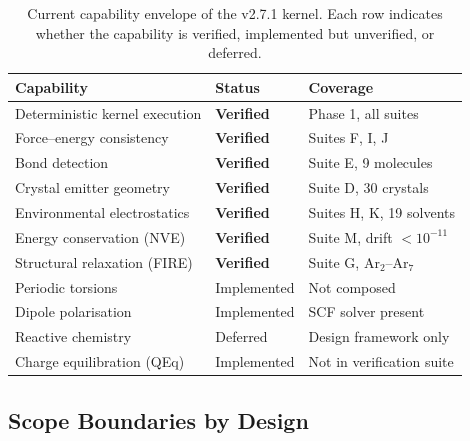 \documentclass[11pt,twoside]{article}
\begin{document}
\begin{table}[H]
\centering
\caption{Current capability envelope of the v2.7.1 kernel. Each row indicates whether the capability is verified, implemented but unverified, or deferred.}
\label{tab:capability-envelope}
\begin{tabular}{lll}
\toprule
\textbf{Capability} & \textbf{Status} & \textbf{Coverage} \\
\midrule
Deterministic kernel execution    & \textbf{Verified} & Phase 1, all suites \\
Force--energy consistency          & \textbf{Verified} & Suites F, I, J \\
Bond detection                     & \textbf{Verified} & Suite E, 9 molecules \\
Crystal emitter geometry           & \textbf{Verified} & Suite D, 30 crystals \\
Environmental electrostatics       & \textbf{Verified} & Suites H, K, 19 solvents \\
Energy conservation (NVE)          & \textbf{Verified} & Suite M, drift $< 10^{-11}$ \\
Structural relaxation (FIRE)       & \textbf{Verified} & Suite G, Ar$_2$--Ar$_7$ \\
Periodic torsions                  & Implemented     & Not composed \\
Dipole polarisation                & Implemented     & SCF solver present \\
Reactive chemistry                 & Deferred        & Design framework only \\
Charge equilibration (QEq)         & Implemented     & Not in verification suite \\
\bottomrule
\end{tabular}
\end{table}

\subsection{Scope Boundaries by Design}
\end{document}
